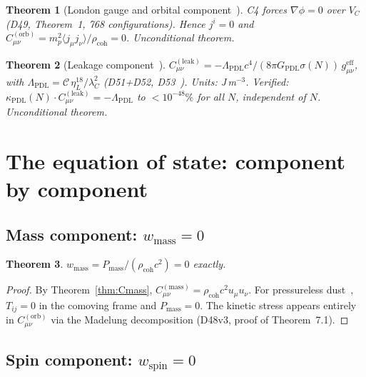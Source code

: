 \documentclass[12pt,a4paper]{article}
\newtheorem{theorem}{Theorem}[section]
\newcommand{\Cmass}{C^{(\mathrm{mass})}}
\newcommand{\Corb}{C^{(\mathrm{orb})}}
\newcommand{\Cleak}{C^{(\mathrm{leak})}}
\newcommand{\rhocoh}{\rho_{\mathrm{coh}}}
\newcommand{\sig}{\sigma}
\newcommand{\kPDL}{\kappa_{\mathrm{PDL}}}
\newcommand{\GPDL}{G_{\mathrm{PDL}}}
\newcommand{\geff}{g_{\mu\nu}^{\mathrm{eff}}}
\newcommand{\VC}{V_C}
\newcommand{\etaL}{\eta_L}
\newcommand{\lambdaC}{\lambda_C}
\newcommand{\LambdaPDL}{\Lambda_{\mathrm{PDL}}}
\begin{document}
\begin{theorem}[London gauge and orbital component~{\cite{PDL_D49_2026,PDL_D48v3_2026}}]
\label{thm:Corb}
C4 forces $\nabla\phi = 0$ over $\VC$ (D49, Theorem~1, 768 configurations). Hence $j^i = 0$ and $\Corb_{\mu\nu} = m_p^2\langle j_\mu j_\nu\rangle/\rhocoh = 0$. Unconditional theorem.
\end{theorem}

\begin{theorem}[Leakage component~{\cite{PDL_D48v3_2026,PDL_D51_2026,PDL_D52_2026}}]
\label{thm:Cleak}
$\Cleak_{\mu\nu} = -\LambdaPDL c^4/(8\pi\GPDL\sig(N))\,\geff$, with $\LambdaPDL = \mathcal{C}\,\etaL^{18}/\lambdaC^2$ (D51+D52, D53~\cite{PDL_D53_2026}). Units: J\,m$^{-3}$. Verified: $\kPDL(N)\cdot\Cleak_{\mu\nu} = -\LambdaPDL$ to $< 10^{-48}\%$ for all $N$, independent of $N$. Unconditional theorem.
\end{theorem}

\section{The equation of state: component by component}
\label{sec:components}

\subsection{Mass component: \texorpdfstring{$w_{\mathrm{mass}} = 0$}{w\_mass = 0}}

\begin{theorem}
\label{thm:wmass}
$w_{\mathrm{mass}} = P_{\mathrm{mass}}/(\rhocoh c^2) = 0$ exactly.
\end{theorem}

\begin{proof}
By Theorem~\ref{thm:Cmass}, $\Cmass_{\mu\nu} = \rhocoh c^2 u_\mu u_\nu$. For pressureless dust~\cite{Misner_1973}, $T_{ij} = 0$ in the comoving frame and $P_{\mathrm{mass}} = 0$. The kinetic stress appears entirely in $\Corb_{\mu\nu}$ via the Madelung decomposition (D48v3, proof of Theorem~7.1).
\end{proof}

\subsection{Spin component: \texorpdfstring{$w_{\mathrm{spin}} = 0$}{w\_spin = 0}}
\end{document}
